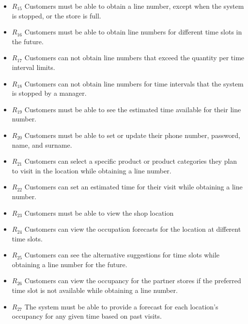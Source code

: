 \begin{itemize}
    \item \textbf{$R_{15}$} Customers must be able to obtain a line number, except when the system is stopped, or the store is full.
    \item \textbf{$R_{16}$} Customers must be able to obtain line numbers for different time slots in the future.
    \item \textbf{$R_{17}$} Customers can not obtain line numbers that exceed the quantity per time interval limits.
    \item \textbf{$R_{18}$} Customers can not obtain line numbers for time intervals that the system is stopped by a manager.
    \item \textbf{$R_{19}$} Customers must be able to see the estimated time available for their line number.
    \item \textbf{$R_{20}$} Customers must be able to set or update their phone number, password, name, and surname.
    \item \textbf{$R_{21}$} Customers can select a specific product or product categories they plan to visit in the location while obtaining a line number.
    \item \textbf{$R_{22}$} Customers can set an estimated time for their visit while obtaining a line number.
    \item \textbf{$R_{23}$} Customers must be able to view the shop location
    \item \textbf{$R_{24}$} Customers can view the occupation forecasts for the location at different time slots.
    \item \textbf{$R_{25}$} Customers can see the alternative suggestions for time slots while obtaining a line number for the future.
    \item \textbf{$R_{26}$} Customers can view the occupancy for the partner stores if the preferred time slot is not available while obtaining a line number.
    \item \textbf{$R_{27}$} The system must be able to provide a forecast for each location's occupancy for any given time based on past visits.
\end{itemize}


